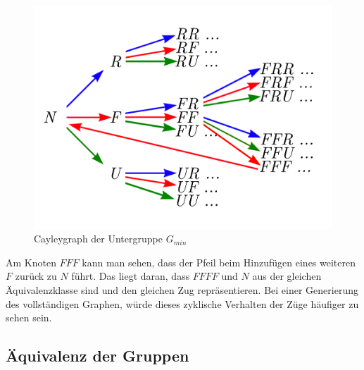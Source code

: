 \documentclass[12pt,a4paper, usenames, dvipsnames]{article}
\theoremstyle{mystyle}
\theoremstyle{definition}
\newcommand{\Gtwo}{\ensuremath{G_{2\times 2\times 2}}}
\newcommand{\Ttwo}{2$\times$2$\times$2-}
\begin{document}
\begin{figure}[H]
\centering
\includegraphics[scale=0.9]{Cayleygraph_URF.png}
\caption{Cayleygraph der Untergruppe $G_{min}$}
\label{Abbildung_Cayleygraph_min}
\end{figure}

Am Knoten $FFF$ kann man sehen, dass der Pfeil beim Hinzufügen eines weiteren $F$ zurück zu $N$ führt. Das liegt daran, dass $FFFF$ und $N$ aus der gleichen Äquivalenzklasse sind und den gleichen Zug repräsentieren. Bei einer Generierung des vollständigen Graphen, würde dieses zyklische Verhalten der Züge häufiger zu sehen sein.
 



%
%
%
%
%
%
%
%
%
%
%
%
%
%
%
%
%
%
\subsection{Äquivalenz der Gruppen}


\end{document}

